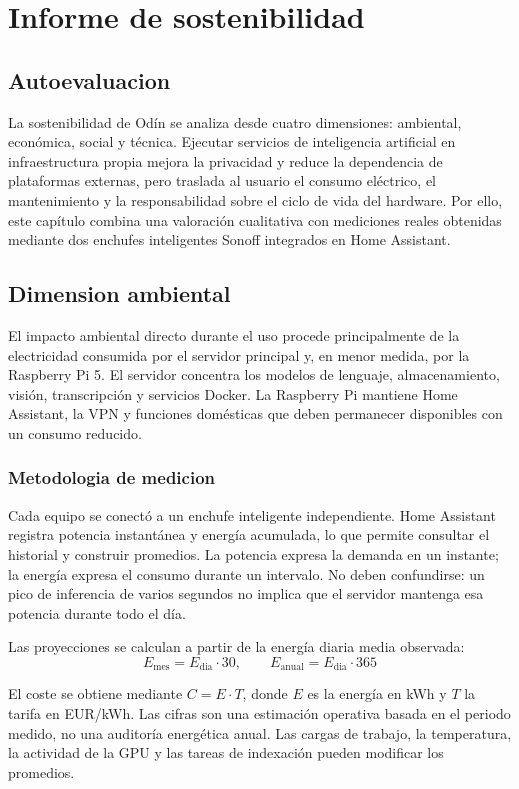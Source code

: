 \chapter{Informe de sostenibilidad}

\section{Autoevaluacion}
La sostenibilidad de Odín se analiza desde cuatro dimensiones: ambiental, económica, social y técnica. Ejecutar servicios de inteligencia artificial en infraestructura propia mejora la privacidad y reduce la dependencia de plataformas externas, pero traslada al usuario el consumo eléctrico, el mantenimiento y la responsabilidad sobre el ciclo de vida del hardware. Por ello, este capítulo combina una valoración cualitativa con mediciones reales obtenidas mediante dos enchufes inteligentes Sonoff integrados en Home Assistant.

\section{Dimension ambiental}
El impacto ambiental directo durante el uso procede principalmente de la electricidad consumida por el servidor principal y, en menor medida, por la Raspberry Pi 5. El servidor concentra los modelos de lenguaje, almacenamiento, visión, transcripción y servicios Docker. La Raspberry Pi mantiene Home Assistant, la VPN y funciones domésticas que deben permanecer disponibles con un consumo reducido.

\subsection{Metodologia de medicion}
Cada equipo se conectó a un enchufe inteligente independiente. Home Assistant registra potencia instantánea y energía acumulada, lo que permite consultar el historial y construir promedios. La potencia expresa la demanda en un instante; la energía expresa el consumo durante un intervalo. No deben confundirse: un pico de inferencia de varios segundos no implica que el servidor mantenga esa potencia durante todo el día.

Las proyecciones se calculan a partir de la energía diaria media observada:
\[
  E_{\mathrm{mes}} = E_{\mathrm{dia}} \cdot 30,
  \qquad
  E_{\mathrm{anual}} = E_{\mathrm{dia}} \cdot 365
\]

El coste se obtiene mediante \(C = E \cdot T\), donde \(E\) es la energía en kWh y \(T\) la tarifa en EUR/kWh. Las cifras son una estimación operativa basada en el periodo medido, no una auditoría energética anual. Las cargas de trabajo, la temperatura, la actividad de la GPU y las tareas de indexación pueden modificar los promedios.

